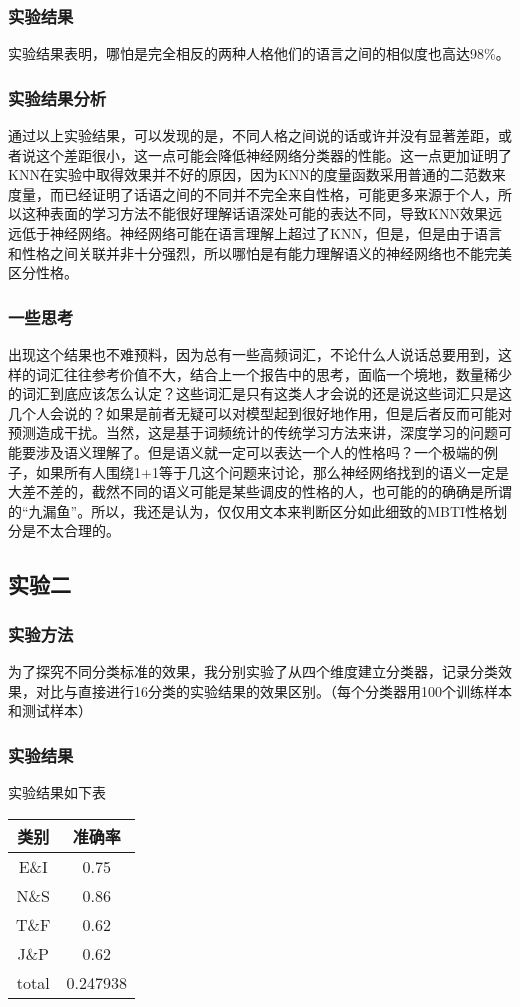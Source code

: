 \documentclass{article}
\begin{document}
	\subsubsection{实验结果}
	实验结果表明，哪怕是完全相反的两种人格他们的语言之间的相似度也高达98\%。
	\subsubsection{实验结果分析}
	通过以上实验结果，可以发现的是，不同人格之间说的话或许并没有显著差距，或者说这个差距很小，这一点可能会降低神经网络分类器的性能。这一点更加证明了KNN在实验中取得效果并不好的原因，因为KNN的度量函数采用普通的二范数来度量，而已经证明了话语之间的不同并不完全来自性格，可能更多来源于个人，所以这种表面的学习方法不能很好理解话语深处可能的表达不同，导致KNN效果远远低于神经网络。神经网络可能在语言理解上超过了KNN，但是，但是由于语言和性格之间关联并非十分强烈，所以哪怕是有能力理解语义的神经网络也不能完美区分性格。
	\subsubsection{一些思考}
	出现这个结果也不难预料，因为总有一些高频词汇，不论什么人说话总要用到，这样的词汇往往参考价值不大，结合上一个报告中的思考，面临一个境地，数量稀少的词汇到底应该怎么认定？这些词汇是只有这类人才会说的还是说这些词汇只是这几个人会说的？如果是前者无疑可以对模型起到很好地作用，但是后者反而可能对预测造成干扰。当然，这是基于词频统计的传统学习方法来讲，深度学习的问题可能要涉及语义理解了。但是语义就一定可以表达一个人的性格吗？一个极端的例子，如果所有人围绕1+1等于几这个问题来讨论，那么神经网络找到的语义一定是大差不差的，截然不同的语义可能是某些调皮的性格的人，也可能的的确确是所谓的“九漏鱼”。所以，我还是认为，仅仅用文本来判断区分如此细致的MBTI性格划分是不太合理的。
	\subsection{实验二}
	\subsubsection{实验方法}
	为了探究不同分类标准的效果，我分别实验了从四个维度建立分类器，记录分类效果，对比与直接进行16分类的实验结果的效果区别。（每个分类器用100个训练样本和测试样本）
	\subsubsection{实验结果}
	实验结果如下表
	\begin{table}[H]
		\centering
		\begin{tabular}{cc}
			\toprule
			类别 & 准确率 \\
			\midrule
			E\&I & 0.75 \\
			N\&S & 0.86 \\
			T\&F & 0.62 \\
			J\&P & 0.62 \\
			total & 0.247938\\
			\bottomrule
		\end{tabular}
	\end{table}
\end{document}
